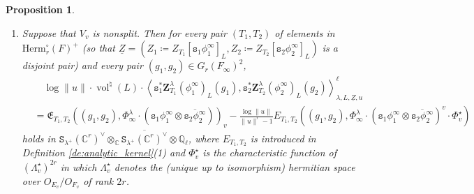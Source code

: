 \documentclass[12pt]{amsart}
\numberwithin{equation}{section}
\theoremstyle{plain}
\newtheorem{proposition}{Proposition}[section]
\theoremstyle{definition}
\theoremstyle{remark}
\renewcommand{\d}[1]{\mathbb{#1}}
\newcommand{\f}[1]{\mathfrak{#1}}
\renewcommand{\r}[1]{\mathrm{#1}}
\renewcommand{\(}{\left(}
\renewcommand{\)}{\right)}
\newcommand{\ol}[1]{\overline{#1}{}}
\newcommand{\ul}{\underline}
\newcommand{\dC}{\d C}
\newcommand{\dQ}{\d Q}
\newcommand{\fE}{\f E}
\newcommand{\tS}{\mathtt{S}}
\newcommand{\ts}{\mathtt{s}}
\newcommand{\bbZ}{\boldsymbol{Z}}
\newcommand{\llangle}{\left\langle}
\newcommand{\rrangle}{\right\rangle}
\newcommand{\Herm}{\r{Herm}}
\DeclareMathOperator{\vol}{vol}
\begin{document}
\begin{proposition}
\begin{enumerate}
  \item Suppose that $V_v$ is nonsplit. Then for every pair $(T_1,T_2)$ of elements in $\Herm_r^\circ(F)^+$ (so that $\ul{Z}=(Z_1\coloneqq Z_{T_1}[\ts_1\phi^\infty_1]_L,Z_2\coloneqq Z_{T_2}[\ts_2\phi^\infty_2]_L)$ is a disjoint pair) and every pair $(g_1,g_2)\in G_r(F_\infty)^2$,
      \begin{align*}
      &\quad\log\|u\|\cdot\vol^\natural(L)\cdot
      \llangle\ts_1^*\bbZ^\lambda_{T_1}(\phi^\infty_1)_L(g_1),
      \ts_2^*\bbZ^\lambda_{T_2}(\phi^\infty_2)_L(g_2)\rrangle_{\lambda,L,\ul{Z},u}^\ell\\
      &=\fE_{T_1,T_2}((g_1,g_2),\Phi^\lambda_\infty\cdot(\ts_1\phi^\infty_1\otimes\ol{\ts_2\phi^\infty_2}))_v
      -\frac{\log\|u\|}{\|u\|^r-1}
      E_{T_1,T_2}((g_1,g_2),\Phi^\lambda_\infty\cdot(\ts_1\phi^\infty_1\otimes\ol{\ts_2\phi^\infty_2})^v\cdot\Phi^\star_v)
      \end{align*}
      holds in $\tS_{\lambda^+}(\dC^r)^\vee\otimes_\dC\ol{\tS_{\lambda^+}(\dC^r)^\vee}\otimes\dQ_\ell$, where $E_{T_1,T_2}$ is introduced in Definition \ref{de:analytic_kernel}(1) and $\Phi_v^\star$ is the characteristic function of $(\Lambda_v^\star)^{2r}$ in which $\Lambda_v^\star$ denotes the (unique up to isomorphism) hermitian space over $O_{E_v}/O_{F_v}$ of rank $2r$.
\end{enumerate}
\end{proposition}
\end{document}

